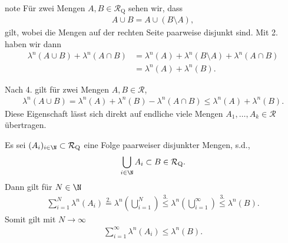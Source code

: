 \documentclass[letterpaper,10pt,german]{jupyterBook}
\begin{document}
\begin{sphinxadmonition}{note}
\sphinxAtStartPar
Für zwei Mengen \(A,B\in\mathcal{R}_{\text{Q}}\) sehen wir, dass
\begin{equation*}
\begin{split}A\cup B = A \cup (B\setminus A),\end{split}
\end{equation*}
\sphinxAtStartPar
gilt, wobei die Mengen auf der rechten Seite paarweise disjunkt sind. Mit 2. haben wir dann
\begin{equation*}
\begin{split}\lambda^n(A\cup B) + \lambda^n(A\cap B)
&= \lambda^n(A) + \lambda^n(B\setminus A) + \lambda^n(A\cap B)
\\&= 
\lambda^n(A) + \lambda^n(B).\end{split}
\end{equation*}
\sphinxAtStartPar
{}

\sphinxAtStartPar
Nach 4. gilt für zwei Mengen \(A,B\in\mathcal{R}\),
\begin{equation*}
\begin{split}\lambda^n(A\cup B) = \lambda^n(A) + \lambda^n(B) - \lambda^n(A\cap B) \leq \lambda^n(A) + \lambda^n(B).\end{split}
\end{equation*}
\sphinxAtStartPar
Diese Eigenschaft lässt sich direkt auf endliche viele Mengen \(A_1,\ldots,A_k\in\mathcal{R}\) übertragen.

\sphinxAtStartPar
{}

\sphinxAtStartPar
Es sei \((A_i)_{i\in\N}\subset \mathcal{R}_{\text{Q}}\) eine Folge paarweiser disjunkter Mengen, s.d.,
\begin{equation*}
\begin{split}\bigcup_{i\in\N} A_i\subset B\in \mathcal{R}_{\text{Q}}.\end{split}
\end{equation*}
\sphinxAtStartPar
Dann gilt für \(N\in\N\)
\begin{equation*}
\begin{split}\sum_{i=1}^N \lambda^n(A_i) 
\overset{2.}{=} \lambda^n\left(\bigcup_{i=1}^N\right) 
\overset{3.}{\leq} \lambda^n\left(\bigcup_{i=1}^\infty\right)
\overset{3.}{\leq} \lambda^n(B).\end{split}
\end{equation*}
\sphinxAtStartPar
Somit gilt mit \(N\to\infty\)
\begin{equation*}
\begin{split}\sum_{i=1}^\infty \lambda^n(A_i) \leq \lambda^n(B).\end{split}
\end{equation*}\end{sphinxadmonition}
\end{document}

